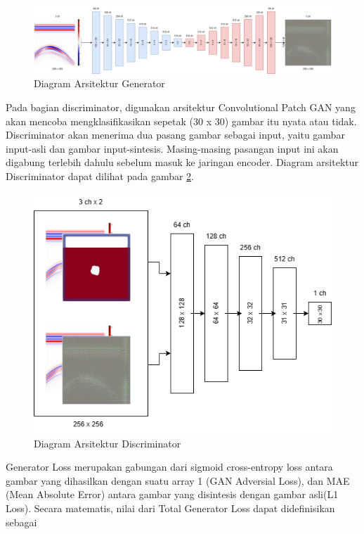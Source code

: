 \documentclass[conference]{IEEEtran}
\begin{document}
\begin{figure}[ht]
  \centering
  \includegraphics[scale=0.15]{gambar/Generator.png}
  \caption{Diagram Arsitektur Generator}
  \label{fig:generator}
\end{figure}

Pada bagian discriminator, digunakan arsitektur Convolutional Patch GAN yang akan mencoba mengklasifikasikan sepetak (30 x 30) gambar itu nyata atau tidak. 
Discriminator akan menerima dua pasang gambar sebagai input, yaitu gambar input-asli dan gambar input-sintesis. 
Masing-masing pasangan input ini akan digabung terlebih dahulu sebelum masuk ke jaringan encoder. 
Diagram arsitektur Discriminator dapat dilihat pada gambar \ref{fig:discriminator}.

\begin{figure}[ht]
  \centering
  \includegraphics[scale=0.3]{gambar/Discriminator.png}
  \caption{Diagram Arsitektur Discriminator}
  \label{fig:discriminator}
\end{figure}

Generator Loss merupakan gabungan dari sigmoid cross-entropy loss antara gambar yang dihasilkan dengan suatu array 1 (GAN Adversial Loss), dan MAE (Mean Absolute Error) antara gambar yang disintesis dengan gambar asli(L1 Loss). 
Secara matematis, nilai dari Total Generator Loss dapat didefinisikan sebagai 
\end{document}
